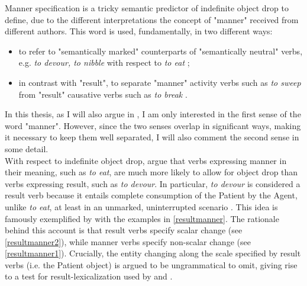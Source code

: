 Manner specification is a tricky semantic predictor of indefinite object drop to define, due to the different interpretations the concept of "manner" received from different authors. This word is used, fundamentally, in two different ways:
\begin{itemize}
    \item to refer to "semantically marked" counterparts of "semantically neutral" verbs, e.g. \textit{to devour, to nibble} with respect to \textit{to eat} \parencite{Naess2007, FellbaumKegl1989taxonomic, Rice1988};
    \item in contrast with "result", to separate "manner" activity verbs such as \textit{to sweep} from "result" causative verbs such as \textit{to break} \parencite{BeaversKoontzGarboden2012, BeaversKoontzGarboden2017, Beavers2013, RappaportLevin1998building, RappaportHovavLevin2005, LevinRappaportHovav2008, RappaportHovavLevin2010}. %
\end{itemize}

In this thesis, as I will also argue in , I am only interested in the first sense of the word "manner". However, since the two senses overlap in significant ways, making it necessary to keep them well separated, I will also comment the second sense in some detail.\\
With respect to indefinite object drop, \textcite{RappaportLevin1998building, RappaportHovavLevin2005, LevinRappaportHovav2008, RappaportHovavLevin2010} argue that verbs expressing manner in their meaning, such as \textit{to eat}, are much more likely to allow for object drop than verbs expressing result, such as \textit{to devour}. In particular, \textit{to devour} is considered a result verb because it entails complete consumption of the Patient by the Agent, unlike \textit{to eat}, at least in an unmarked, uninterrupted scenario \parencite{Melchin2019, smollett2005quantized, pinon2008aspectual}. This idea is famously exemplified by \textcite{RappaportLevin1998building} with the examples in \ref{resultmanner}. The rationale behind this account is that result verbs specify scalar change (see \ref{resultmanner2}), while manner verbs specify non-scalar change (see \ref{resultmanner1}). Crucially, the entity changing along the scale specified by result verbs (i.e. the Patient object) is argued to be ungrammatical to omit, giving rise to a test for result-lexicalization used by \textcite{BeaversKoontzGarboden2012} and \textcite{Rissman2016}.

